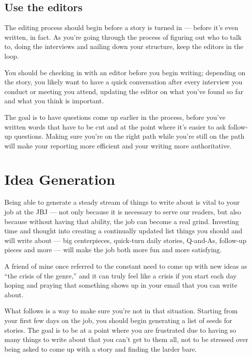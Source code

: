 \documentclass[
  11pt,
  american,
  letterpaperpaper,
  extrafontsizes,onecolumn,openright
  ]{memoir}
\begin{document}
\hypertarget{use-the-editors}{%
\section*{Use the editors}\label{use-the-editors}}

The editing process should begin before a story is turned in --- before it's even written, in fact. As you're going through the process of figuring out who to talk to, doing the interviews and nailing down your structure, keep the editors in the loop.

You should be checking in with an editor before you begin writing; depending on the story, you likely want to have a quick conversation after every interview you conduct or meeting you attend, updating the editor on what you've found so far and what you think is important.

The goal is to have questions come up earlier in the process, before you've written words that have to be cut and at the point where it's easier to ask follow-up questions. Making sure you're on the right path while you're still on the path will make your reporting more efficient and your writing more authoritative.

\hypertarget{idea-generation}{%
\chapter{Idea Generation}\label{idea-generation}}

Being able to generate a steady stream of things to write about is vital to your job at the JBJ --- not only because it is necessary to serve our readers, but also because without having that ability, the job can become a real grind. Investing time and thought into creating a continually updated list things you should and will write about --- big centerpieces, quick-turn daily stories, Q-and-As, follow-up pieces and more --- will make the job both more fun and more satisfying.

A friend of mine once referred to the constant need to come up with new ideas as \enquote{the crisis of the genre,} and it can truly feel like a crisis if you start each day hoping and praying that something shows up in your email that you can write about.

What follows is a way to make sure you're not in that situation. Starting from your first few days on the job, you should begin generating a list of seeds for stories. The goal is to be at a point where you are frustrated due to having so many things to write about that you can't get to them all, not to be stressed over being asked to come up with a story and finding the larder bare.
\end{document}
